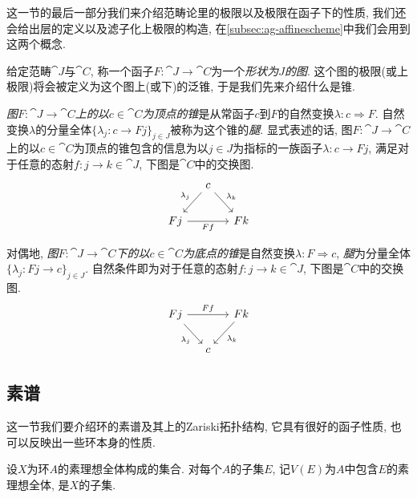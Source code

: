 这一节的最后一部分我们来介绍范畴论里的极限以及极限在函子下的性质, 我们还会给出层的定义以及滤子化上极限的构造, 在\ref{subsec:ag-affinescheme}中我们会用到这两个概念.

给定范畴$\cat{J}$与$\cat{C}$, 称一个函子$F\colon \cat{J}\to \cat{C}$为一个\emph{形状为$J$的图}. 这个图的极限(或上极限)将会被定义为这个图上(或下)的泛锥, 于是我们先来介绍什么是锥.

\emph{图$F\colon \cat{J}\to\cat{C}$上的以$c\in\cat{C}$为顶点的锥}是从常函子$c$到$F$的自然变换$\lambda\colon c\Rightarrow F$. 自然变换$\lambda$的分量全体$\{\lambda_j\colon c\to Fj\}_{j\in J}$被称为这个锥的\emph{腿}. 显式表述的话, 图$F\colon \cat{J}\to\cat{C}$上的以$c\in\cat{C}$为顶点的锥包含的信息为以$j\in J$为指标的一族函子$\lambda\colon c\to Fj$, 满足对于任意的态射$f\colon j\to k\in \cat{J}$, 下图是$\cat{C}$中的交换图.
\begin{equation*}
  \begin{tikzcd}[column sep=small]
    & c & \\
    Fj & & Fk
    \arrow[from=1-2,]{2-1}[swap]{\lambda_j}
    \arrow[from=1-2,]{2-3}[]{\lambda_k}
    \arrow[from=2-1,]{2-3}[below]{Ff}
  \end{tikzcd}
\end{equation*}

对偶地, \emph{图$F\colon \cat{J}\to\cat{C}$下的以$c\in\cat{C}$为底点的锥}是自然变换$\lambda\colon F\Rightarrow c$, \emph{腿}为分量全体$\{\lambda_j\colon Fj\to c\}_{j\in J}$. 自然条件即为对于任意的态射$f\colon j\to k\in \cat{J}$, 下图是$\cat{C}$中的交换图.
\begin{equation*}
  \begin{tikzcd}[column sep=small]
    Fj & & Fk\\
    & c &
    \arrow[from=1-1,]{2-2}[swap]{\lambda_j}
    \arrow[from=1-1,]{1-3}[]{Ff}
    \arrow[from=1-3,]{2-2}[]{\lambda_k}
  \end{tikzcd}
\end{equation*}


\subsection{素谱}\label{subsec:primespec}

这一节我们要介绍环的素谱及其上的Zariski拓扑结构, 它具有很好的函子性质, 也可以反映出一些环本身的性质.

设$X$为环$A$的素理想全体构成的集合. 对每个$A$的子集$E$, 记$V(E)$为$A$中包含$E$的素理想全体, 是$X$的子集.

